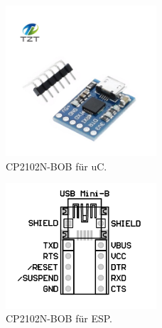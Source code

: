\begin{figure}[!h]
\center
\includegraphics[width = 0.5\textwidth]{graphics/Produktbild_USB_UART_uC}
\caption{CP2102N-BOB für uC.}
\label{fig:Produktbild_USB_UART_uC}
\end{figure}

\begin{figure}[!h]
\center
\includegraphics[width = 0.5\textwidth]{graphics/Produktbild_USB_UART_ESP}
\caption{CP2102N-BOB für ESP.}
\label{fig:Produktbild_USB_UART_ESP}
\end{figure}
